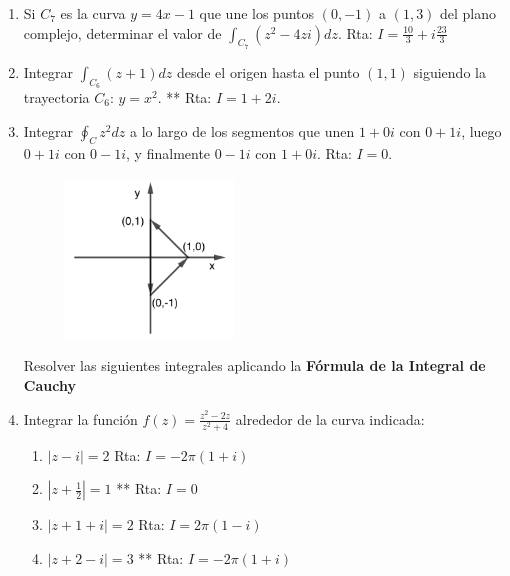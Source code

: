 \documentclass[10pt,a4paper]{article}
\begin{document}
\begin{enumerate}
\item {Si $C_7$ es la curva $y=4x-1$ que une los puntos $(0,-1)$ a $(1,3)$ del 
plano complejo, determinar el valor de $\int_{C_7}^{}(z^2-4zi) dz$. \tab Rta: 
$I=\frac{10}{3}+i\frac{23}{3}$}

\item {Integrar $\int_{C_6}(z+1)dz$ desde el origen hasta el punto $(1,1)$ 
siguiendo la trayectoria $C_6$: $y=x^2$. ** \tab Rta: $I=1+2i$.}	

\item {Integrar $\oint_{C}z^2dz$ a lo largo de los segmentos que unen $1+0i$ 
con 
$0+1i$, luego $0+1i$ con $0-1i$, y finalmente $0-1i$ con $1+0i$. \tab Rta: 
$I=0$.}	

	\begin{figure}[!htbp]
		\centering
		\includegraphics[width=4.5cm]{tp3_6.png}
		\label{fig:ej3a}
	\end{figure}

Resolver las siguientes integrales aplicando la \textbf{F\'ormula de la Integral de Cauchy}
\item Integrar la funci\'on $f(z)=\frac{z^2-2z}{z^2+4}$ alrededor de la curva indicada:
\begin{enumerate}
	\item $|z-i|=2$ \tab Rta: $I=-2\pi (1+i)$
	\item $\left| z+\frac{1}{2}\right| =1$ ** \tab Rta: $I=0$
	\item $|z+1+i|=2$ \tab Rta: $I=2\pi (1-i)$
	\item $|z+2-i|=3$ ** \tab Rta: $I=-2\pi (1+i)$
\end{enumerate}


\end{enumerate}
\end{document}
